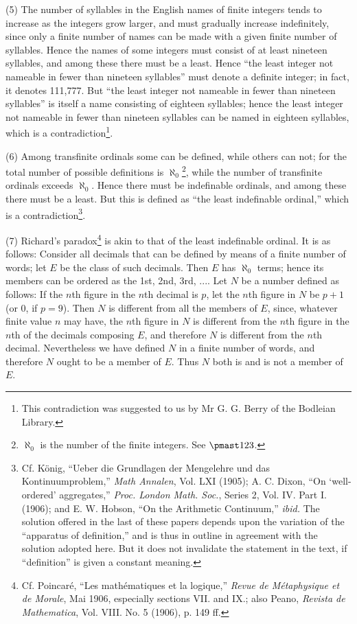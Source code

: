 \documentclass[letterpaper,12pt,openany,leqno]{book}
\newcommand{\pagefirst}[1]{\marginnote[\boxed{\text{#1}}]{\boxed{\text{#1}}}}
\begin{document}
(5) The number of syllables in the English names of finite integers tends to increase as the integers grow larger, and must gradually increase indefinitely, since only a finite number of names can be made with a given finite number of syllables. Hence the names of some integers must consist of at least nineteen syllables, and among these there must be a least. Hence ``the least integer not nameable in fewer than nineteen syllables'' \pagefirst{64} must denote a definite integer; in fact, it denotes 111,777. But ``the least integer not nameable in fewer than nineteen syllables'' is itself a name consisting of eighteen syllables; hence the least integer not nameable in fewer than nineteen syllables can be named in eighteen syllables, which is a contradiction\footnote{This contradiction was suggested to us by Mr G. G. Berry of the Bodleian Library.}.

(6) Among transfinite ordinals some can be defined, while others can not; for the total number of possible definitions is $\aleph_0$\footnote{$\aleph_0$ is the number of the finite integers. See $\pmast123$.}, while the number of transfinite ordinals exceeds $\aleph_0$. Hence there must be indefinable ordinals, and among these there must be a least. But this is defined as ``the least indefinable ordinal,'' which is a contradiction\footnote{Cf. K{\"o}nig, ``Ueber die Grundlagen der Mengelehre und das Kontinuumproblem,'' \textit{Math Annalen}, Vol. LXI (1905); A. C. Dixon, ``On `well-ordered' aggregates,'' \textit{Proc. London Math. Soc.}, Series 2, Vol. IV. Part I. (1906); and E. W. Hobson, ``On the Arithmetic Continuum,'' \textit{ibid.} The solution offered in the last of these papers depends upon the variation of the ``apparatus of definition,'' and is thus in outline in agreement with the solution adopted here. But it does not invalidate the statement in the text, if ``definition'' is given a constant meaning.}.

(7) Richard's paradox\footnote{Cf. Poincar\'e, ``Les math\'ematiques et la logique,'' \textit{Revue de M\'etaphysique et de Morale}, Mai 1906, especially sections VII. and IX.; also Peano, \textit{Revista de Mathematica}, Vol. VIII. No. 5 (1906), p. 149 ff.} is akin to that of the least indefinable ordinal. It is as follows: Consider all decimals that can be defined by means of a finite number of words; let $E$ be the class of such decimals. Then $E$ has $\aleph_0$ terms; hence its members can be ordered as the 1st, 2nd, 3rd, $...$. Let $N$ be a number defined as follows: If the $n$th figure in the $n$th decimal is $p$, let the $n$th figure in $N$ be $p+1$ (or $0$, if $p=9$). Then $N$ is different from all the members of $E$, since, whatever finite value $n$ may have, the $n$th figure in $N$ is different from the $n$th figure in the $n$th of the decimals composing $E$, and therefore $N$ is different from the $n$th decimal. Nevertheless we have defined $N$ in a finite number of words, and therefore $N$ ought to be a member of $E$. Thus $N$ both is and is not a member of $E$.
\end{document}
